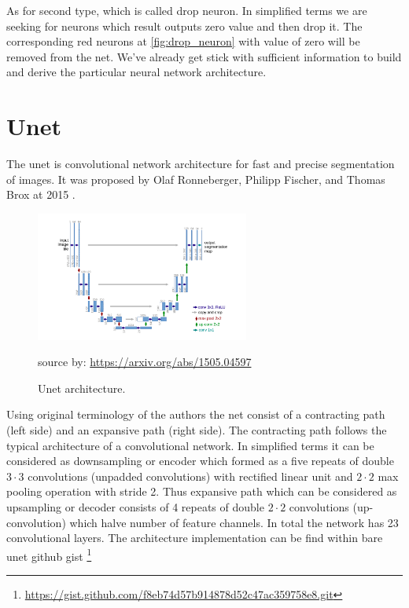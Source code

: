 As for second type, which is called drop neuron. In simplified terms we are seeking for neurons which result outputs zero value and then drop it. The corresponding red neurons at \ref{fig:drop_neuron} with value of zero will be removed from the net. We've already get stick with sufficient information to build and derive the particular neural network architecture. 

\section{Unet}
The unet is convolutional network architecture for fast and precise segmentation of images. It was proposed by Olaf Ronneberger, Philipp Fischer, and Thomas Brox at 2015 \cite{Ronneberger2015}. 
\begin{figure}[h]
    \centering \includegraphics[width=7cm]{images/unet.png}
    \caption {Unet architecture.}
    \small source by: \url{https://arxiv.org/abs/1505.04597}
\end{figure}

Using original terminology of the authors \cite{Ronneberger2015} the net consist of a contracting path (left side) and an expansive path (right side). The contracting path follows the typical architecture of a convolutional network. In simplified terms it can be considered as downsampling or encoder which formed as
a five repeats of double $3 \cdot 3$ convolutions (unpadded convolutions) with rectified linear unit and $2 \cdot 2$ max pooling operation with stride 2. Thus expansive path which can be considered as upsampling or decoder consists of 4 repeats of double $2 \cdot 2$ convolutions (up-convolution) which halve number of feature channels. In total the network has 23 convolutional layers. The architecture implementation can be find within bare unet github gist \footnote { \url{https://gist.github.com/f8eb74d57b914878d52c47ac359758e8.git}}

